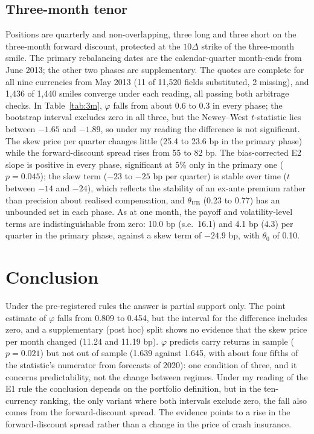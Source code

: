 \documentclass[11pt]{article}
\theoremstyle{result}
\newcommand{\thUB}{\theta_{\mathrm{UB}}}
\newcommand{\D}{\Delta}
\begin{document}
\subsection{Three-month tenor}

Positions are quarterly and non-overlapping, three long and three short on the three-month forward discount, protected at the $10\D$ strike of the three-month smile. The primary rebalancing dates are the calendar-quarter month-ends from June 2013; the other two phases are supplementary. The quotes are complete for all nine currencies from May 2013 (11 of 11,520 fields substituted, 2 missing), and 1,436 of 1,440 smiles converge under each reading, all passing both arbitrage checks. In Table~\ref{tab:3m}, $\varphi$ falls from about 0.6 to 0.3 in every phase; the bootstrap interval excludes zero in all three, but the Newey--West $t$-statistic lies between $-1.65$ and $-1.89$, so under my reading the difference is not significant. The skew price per quarter changes little (25.4 to 23.6 bp in the primary phase) while the forward-discount spread rises from 55 to 82 bp. The bias-corrected E2 slope is positive in every phase, significant at 5\% only in the primary one ($p=0.045$); the skew term ($-23$ to $-25$ bp per quarter) is stable over time ($t$ between $-14$ and $-24$), which reflects the stability of an ex-ante premium rather than precision about realised compensation, and $\thUB$ (0.23 to 0.77) has an unbounded set in each phase. As at one month, the payoff and volatility-level terms are indistinguishable from zero: 10.0 bp (s.e.\ 16.1) and 4.1 bp (4.3) per quarter in the primary phase, against a skew term of $-24.9$ bp, with $\theta_0$ of 0.10.

\section{Conclusion}\label{sec:concl}

Under the pre-registered rules the answer is partial support only. The point estimate of $\varphi$ falls from 0.809 to 0.454, but the interval for the difference includes zero, and a supplementary (post hoc) split shows no evidence that the skew price per month changed (11.24 and 11.19 bp). $\varphi$ predicts carry returns in sample ($p=0.021$) but not out of sample (1.639 against 1.645, with about four fifths of the statistic's numerator from forecasts of 2020): one condition of three, and it concerns predictability, not the change between regimes. Under my reading of the E1 rule the conclusion depends on the portfolio definition, but in the ten-currency ranking, the only variant where both intervals exclude zero, the fall also comes from the forward-discount spread. The evidence points to a rise in the forward-discount spread rather than a change in the price of crash insurance.
\end{document}
